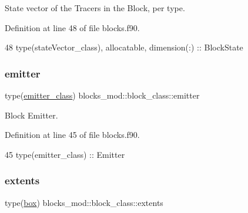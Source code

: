 State vector of the Tracers in the Block, per type. 



Definition at line 48 of file blocks.\+f90.


\begin{DoxyCode}
48         \textcolor{keywordtype}{type}(stateVector\_class), \textcolor{keywordtype}{allocatable}, \textcolor{keywordtype}{dimension(:)} :: BlockState
\end{DoxyCode}
\mbox{\label{structblocks__mod_1_1block__class_a55e85183ba871abcaba1c00d5393611f}} 
\subsubsection{\texorpdfstring{emitter}{emitter}}
{\footnotesize\ttfamily type(\mbox{\hyperlink{structemitter__mod_1_1emitter__class}{emitter\+\_\+class}}) blocks\+\_\+mod\+::block\+\_\+class\+::emitter\hspace{0.3cm}{\ttfamily [private]}}



Block Emitter. 



Definition at line 45 of file blocks.\+f90.


\begin{DoxyCode}
45         \textcolor{keywordtype}{type}(emitter\_class)    :: Emitter
\end{DoxyCode}
\mbox{\label{structblocks__mod_1_1block__class_aff3b0cb7d8248f8a87691a028de916d3}} 
\subsubsection{\texorpdfstring{extents}{extents}}
{\footnotesize\ttfamily type(\mbox{\hyperlink{structgeometry__mod_1_1box}{box}}) blocks\+\_\+mod\+::block\+\_\+class\+::extents\hspace{0.3cm}{\ttfamily [private]}}



